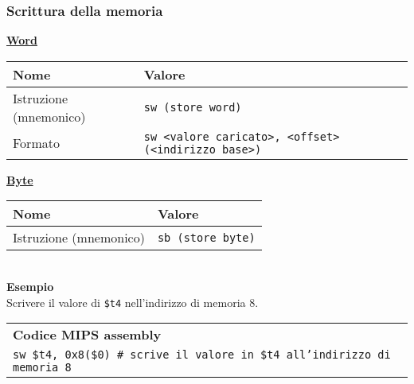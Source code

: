\documentclass[../main.tex]{subfiles}
\begin{document}
\subsubsection*{Scrittura della memoria}
\underline{\textbf{Word}}
\begin{table}[htb!]
    \centering
    \begin{tabular}{ p{4.5cm} | p{10.5cm} }
        Nome & Valore \\
        \hline
        Istruzione (mnemonico) & \texttt{sw (store word)} \\
        Formato & \texttt{sw <valore caricato>, <offset>(<indirizzo base>)}
    \end{tabular}
\end{table}
\newline
\underline{\textbf{Byte}}
\begin{table}[htb!]
    \centering
    \begin{tabular}{ p{4.5cm} | p{10.5cm} }
        Nome & Valore \\
        \hline
        Istruzione (mnemonico) & \texttt{sb (store byte)} \\
    \end{tabular}
\end{table}
\\[3mm]
\textbf{Esempio} \\
Scrivere il valore di \texttt{\$t4} nell'indirizzo di memoria 8.
\\[3mm]
\begin{tabular}{ l }
    \textbf{Codice MIPS assembly} \\
    \texttt{sw \$t4, 0x8(\$0) \hspace*{2mm} \# scrive il valore in \$t4 all'indirizzo di memoria 8}
\end{tabular}
\\[3mm]
\end{document}
